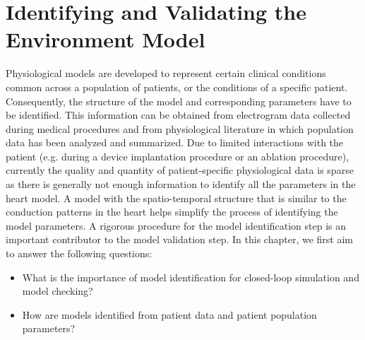 \chapter{Identifying and Validating the Environment Model }

Physiological models are developed to represent certain clinical conditions common across a population of patients, or the conditions of a specific patient. Consequently, the structure of the model and corresponding parameters have to be identified. This information can be obtained from electrogram data collected during medical procedures and from physiological literature in which population data has been analyzed and summarized. Due to limited interactions with the patient (e.g. during a device implantation procedure or an ablation procedure), currently the quality and quantity of patient-specific physiological data is sparse as there is generally not enough information to identify all the parameters in the heart model.  A model with the spatio-temporal structure that is similar to the conduction patterns in the heart helps simplify the process of identifying the model parameters. A rigorous procedure for the model identification step is an important contributor to the model validation step. In this chapter, we first aim to answer the following questions:

\begin{itemize}
	\vspace{-5pt}
	\item What is the importance of model identification for closed-loop simulation and model checking?
	\vspace{-5pt}
    	\item How are models identified from patient data and patient population parameters?
\end{itemize}


